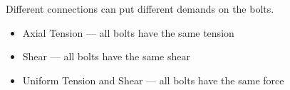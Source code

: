 Different connections can put different demands on the bolts.
\begin{itemize}
\item Axial Tension --- all bolts have the same tension
\begin{figure}[H]
\end{figure}
\item Shear --- all bolts have the same shear
\begin{figure}[H]
\end{figure}
\item Uniform Tension and Shear --- all bolts have the same force
\begin{figure}[H]
\end{figure}
\end{itemize}
